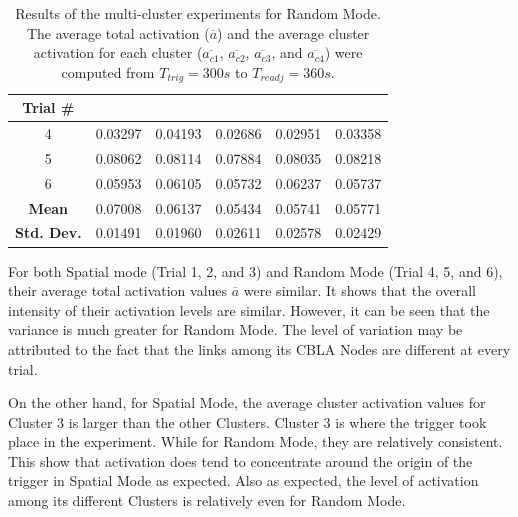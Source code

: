 \begin{table}[!htbp]
	\caption[Results of the multi-cluster experiment for Random Mode]{Results of the multi-cluster experiments for Random Mode. The average total activation ($\overline{a}$) and the average cluster activation for each cluster ($\overline{a_{c1}}$, $\overline{a_{c2}}$, $\overline{a_{c3}}$, and $\overline{a_{c4}}$) were computed from $T_{trig} = 300s$ to  $T_{readj} = 360s$. }
	\begin{center}
		\begin{tabular}{ | c | c | c | c | c | c |} 
			\hline
			\textbf{Trial \#} & \boldmath{$\overline{a}$}  & \boldmath{$\overline{a_{c1}}$}  & \boldmath{$\overline{a_{c2}}$} & \boldmath{$\overline{a_{c3}}$} & \boldmath{$\overline{a_{c4}}$} \\ 
			\hline
			\hline
			4 & 0.03297	& 0.04193 &	0.02686 & 0.02951 & 0.03358 \\
			\hline
			5 &	0.08062 & 0.08114 & 0.07884 & 0.08035 & 0.08218 \\
			\hline
			6 &	0.05953 & 0.06105 &	0.05732 & 0.06237 & 0.05737 \\
			\hlineB{3}	
			\textbf{Mean} & 0.07008	& 0.06137 &	0.05434	& 0.05741 & 0.05771  \\
			\hline
			\textbf{Std. Dev.} & 0.01491 & 0.01960 & 0.02611 & 0.02578 & 0.02429 \\
			\hline	
		\end{tabular}
	\end{center}
	\label{table:multi-cluster-results-random}
\end{table}

For both Spatial mode (Trial 1, 2, and 3) and Random Mode (Trial 4, 5, and 6), their average total activation values $\overline{a}$ were similar. It shows that the overall intensity of their activation levels are similar. However, it can be seen that the variance is much greater for Random Mode. The level of variation may be attributed to the fact that the links among its CBLA Nodes are different at every trial.

On the other hand, for Spatial Mode, the average cluster activation values for Cluster 3 is larger than the other Clusters. Cluster 3 is where the trigger took place in the experiment. While for Random Mode, they are relatively consistent. This show that activation does tend to concentrate around the origin of the trigger in Spatial Mode as expected. Also as expected, the level of activation among its different Clusters is relatively even for Random Mode. 

